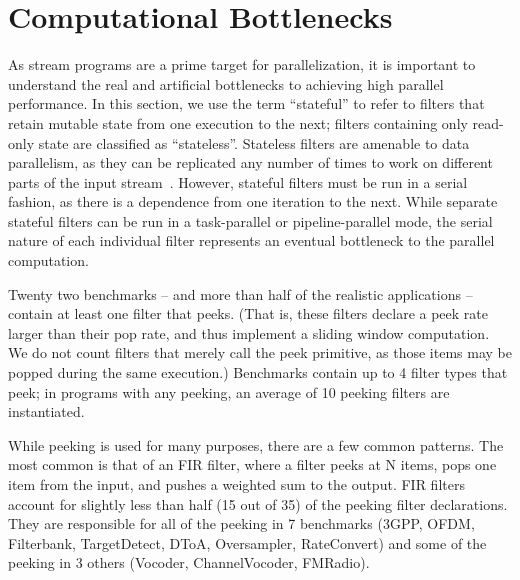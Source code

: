 \section{Computational Bottlenecks}

As stream programs are a prime target for parallelization, it is
important to understand the real and artificial bottlenecks to
achieving high parallel performance.  In this section, we use the term
``stateful'' to refer to filters that retain mutable state from one
execution to the next; filters containing only read-only state are
classified as ``stateless''.  Stateless filters are amenable to data
parallelism, as they can be replicated any number of times to work on
different parts of the input stream~\cite{gordon-asplos06}.  However,
stateful filters must be run in a serial fashion, as there is a
dependence from one iteration to the next.  While separate stateful
filters can be run in a task-parallel or pipeline-parallel mode, the
serial nature of each individual filter represents an eventual
bottleneck to the parallel computation.

\myitem {\slidingwindows} Twenty two benchmarks -- and more than half
of the realistic applications -- contain at least one filter that
peeks.  (That is, these filters declare a peek rate larger than their
pop rate, and thus implement a sliding window computation.
We do not count filters that merely call the peek primitive, as those
items may be popped during the same execution.)  Benchmarks contain up
to 4 filter types that peek; in programs with any peeking, an average
of 10 peeking filters are instantiated.
\label{sec:peeking}

While peeking is used for many purposes, there are a few common
patterns.  The most common is that of an FIR filter, where a filter
peeks at N items, pops one item from the input, and pushes a weighted
sum to the output.  FIR filters account for slightly less than half
(15 out of 35) of the peeking filter declarations.  They are
responsible for all of the peeking in 7 benchmarks (3GPP, OFDM,
Filterbank, TargetDetect, DToA, Oversampler, RateConvert) and some of
the peeking in 3 others (Vocoder, ChannelVocoder, FMRadio).

